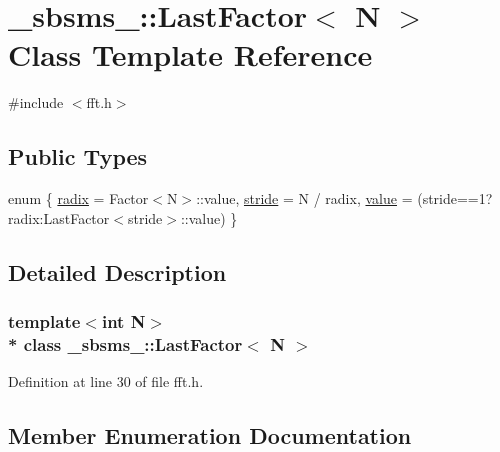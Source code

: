 \hypertarget{class__sbsms___1_1_last_factor}{}\section{\+\_\+sbsms\+\_\+\+:\+:Last\+Factor$<$ N $>$ Class Template Reference}
\label{class__sbsms___1_1_last_factor}


{\ttfamily \#include $<$fft.\+h$>$}

\subsection*{Public Types}
\begin{DoxyCompactItemize}
\item 
enum \{ \hyperlink{class__sbsms___1_1_last_factor_a857ccc8b5cefe35974f833e28fae323fa4f03b86a85486d14a338553a77e49c5d}{radix} = Factor$<$N$>$\+:\+:value, 
\hyperlink{class__sbsms___1_1_last_factor_a857ccc8b5cefe35974f833e28fae323fa92908d0035b740829444ca5eef362d56}{stride} = N / radix, 
\hyperlink{class__sbsms___1_1_last_factor_a857ccc8b5cefe35974f833e28fae323fab36503e9588115e78961f29adf32aff2}{value} = (stride==1?radix\+:Last\+Factor$<$stride$>$\+:\+:value)
 \}
\end{DoxyCompactItemize}


\subsection{Detailed Description}
\subsubsection*{template$<$int N$>$\\*
class \+\_\+sbsms\+\_\+\+::\+Last\+Factor$<$ N $>$}



Definition at line 30 of file fft.\+h.



\subsection{Member Enumeration Documentation}
